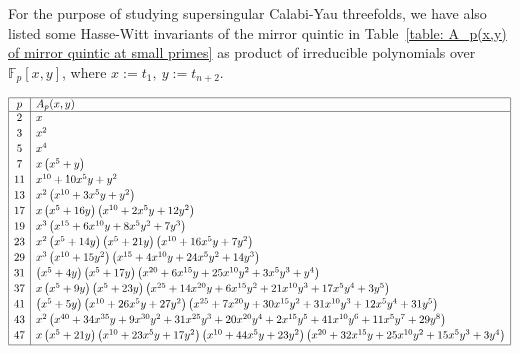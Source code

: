 \documentclass[11pt,leqno]{article}
\theoremstyle{remark}
\theoremstyle{definition}
\begin{document}
For the purpose of studying supersingular Calabi-Yau threefolds, we have also listed some Hasse-Witt invariants of the mirror quintic in Table~\ref{table: A_p(x,y) of mirror quintic at small primes} as product of irreducible polynomials over $\mathbb{F}_p[x,y]$, where $x:=t_1,\ y:=t_{n+2}$. 
\begin{table}
\begin{equation*}
\begin{array}{|c|l|}
\hline
 p & A_p(x,y) \\
 \hline
 2 & x \\[2pt]
 3 & x^2 \\[2pt]
 5 & x^4 \\[2pt]
 7 & x \left(x^5+y\right) \\[2pt]
 11 & x^{10}+10 x^5 y+y^2 \\[2pt]
 13 & x^2 \left(x^{10}+3 x^5 y+y^2\right) \\[2pt]
 17 & x \left(x^5+16 y\right) \left(x^{10}+2 x^5 y+12 y^2\right) \\[2pt]
 19 & x^3 \left(x^{15}+6 x^{10} y+8 x^5 y^2+7 y^3\right) \\[2pt]
 23 & x^2 \left(x^5+14 y\right) \left(x^5+21 y\right) \left(x^{10}+16 x^5 y+7 y^2\right) \\[2pt]
 29 & x^3 \left(x^{10}+15 y^2\right) \left(x^{15}+4 x^{10} y+24 x^5 y^2+14 y^3\right) \\[2pt]
 31 & \left(x^5+4 y\right) \left(x^5+17 y\right) \left(x^{20}+6 x^{15} y+25 x^{10} y^2+3 x^5 y^3+y^4\right) \\[2pt]
 37 & x \left(x^5+9 y\right) \left(x^5+23 y\right) \left(x^{25}+14 x^{20} y+6 x^{15} y^2+21 x^{10} y^3+17 x^5 y^4+3 y^5\right) \\[2pt]
 41 & \left(x^5+5 y\right) \left(x^{10}+26 x^5 y+27 y^2\right) \left(x^{25}+7 x^{20} y+30 x^{15} y^2+31 x^{10} y^3+12 x^5 y^4+31 y^5\right) \\[2pt]
 43 & x^2 \left(x^{40}+34 x^{35} y+9 x^{30} y^2+31 x^{25} y^3+20 x^{20} y^4+2 x^{15} y^5+41 x^{10} y^6+11 x^5 y^7+29 y^8\right) \\[2pt]
 47 & x \left(x^5+21 y\right) \left(x^{10}+23 x^5 y+17 y^2\right) \left(x^{10}+44 x^5 y+23 y^2\right) \left(x^{20}+32 x^{15} y+25 x^{10} y^2+15 x^5 y^3+3 y^4\right) \\[2pt]
 \hline

\end{array}
\end{equation*}
\end{table}
\end{document}
